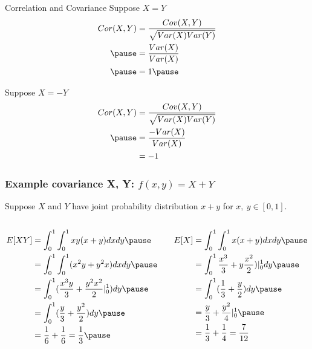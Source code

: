 \documentclass[aspectratio=169, handout]{beamer}
\numberwithin{equation}{section}
\begin{document}
\begin{frame}{Correlation and Covariance}
Suppose $X = Y$ \pause 
\begin{align*}
Cor(X,Y) &= \frac{Cov(X,Y)}{\sqrt{Var(X)Var(Y)} }  \\ \pause 
&= \frac{Var(X)}{Var(X)}  \\ \pause 
&= 1   \pause 
\end{align*}

Suppose $X = -Y$  \pause 
\begin{align*}
Cor(X,Y) &= \frac{Cov(X,Y)}{\sqrt{Var(X)Var(Y)} } \\ \pause 
& =   \frac{- Var(X)}{Var(X)}  \\
& =   -1
\end{align*}

\end{frame}

\begin{frame}
\frametitle{Example covariance X, Y: $f(x,y)=X + Y$} 
Suppose $X$ and $Y$ have joint probability distribution $x + y$ for $x,\ y \in [0,1]$.  \pause \\
\begin{columns}
\begin{column}{0.5\textwidth}
\begin{align*}
E[XY] &= \int_{0}^{1} \int_{0}^{1} xy (x + y) dx dy \pause \\
&= \int_{0}^{1} \int_{0}^{1} (x^2 y + y^2 x) dx dy   \pause \\
&= \int_{0}^{1}(\frac{x^3 y}{3} + \frac{y^2 x^2}{2}|_0^1 )dy   \pause \\
&= \int_{0}^{1} (\frac{y}{3} + \frac{y^2}{2} ) dy  \pause \\
&= \frac{1}{6} + \frac{1}{6} = \frac{1}{3} \pause  
\end{align*}
\end{column}
\begin{column}{0.5\textwidth}
\begin{align*}
E[X] &= \int_{0}^{1} \int_{0}^{1} x (x + y) dxdy  \pause \\
 &= \int_{0}^{1}\frac{x^3}{3} + y\frac{x^2}{2}) |_0^1dy  \pause \\
 &= \int_{0}^{1}(\frac{1}{3} + \frac{y}{2})dy  \pause \\
  &= \frac{y}{3} + \frac{y^2}{4} |_0^1  \pause \\
   &= \frac{1}{3} + \frac{1}{4} = \frac{7}{12} 
 \end{align*}
 \end{column}
\end{columns}

\end{frame}
\end{document}
